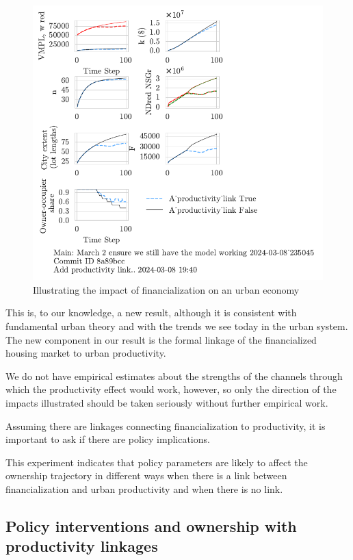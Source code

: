 \begin{figure}[h!tb]\label{fig-impact-channel-example}
    \centering
    \includegraphics[scale=1, trim=.25cm 2cm .25cm .25cm, clip]{fig/productivity_link.pdf}
    \caption{Illustrating the impact of financialization on an urban economy}
\end{figure}
This is, to our knowledge, a new result, although it is consistent with fundamental urban theory and with the trends we see today in the urban system. The new component in our result is the formal linkage of the financialized housing market to urban productivity.

We do not have empirical estimates about the strengths of the channels through which the productivity effect would work, however, so only the direction of the impacts illustrated should be taken seriously without further empirical work.  

Assuming there are linkages connecting financialization to productivity, it is important to ask if there are policy implications. 



This experiment indicates that policy parameters are likely to affect the ownership trajectory in different ways when there is a link between financialization and urban productivity and when there is no link.

\subsection{Policy interventions and ownership with productivity linkages}

